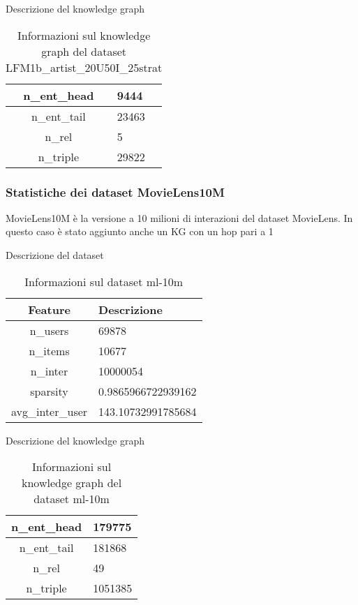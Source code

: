 \noindent Descrizione del knowledge graph
\begin{table}[H]
    \centering
    \footnotesize
    \begin{tabularx}{\textwidth}{|c|X|}
        \hline
        n\_ent\_head & 9444 \\
        \hline
        n\_ent\_tail & 23463 \\
        \hline
        n\_rel & 5 \\
        \hline
        n\_triple & 29822 \\
        \hline
    \end{tabularx}
    \caption{Informazioni sul knowledge graph del dataset LFM1b\_artist\_20U50I\_25strat}
    \label{tab:dataset_info}
\end{table}

\newpage

\subsubsection{Statistiche dei dataset MovieLens10M}

\noindent MovieLens10M è la versione a 10 milioni di interazioni del dataset MovieLens. In questo caso è stato aggiunto anche un KG con un hop pari a 1

\noindent Descrizione del dataset
\begin{table}[H]
    \centering
    \footnotesize
    \begin{tabularx}{\textwidth}{|c|X|}
        \hline
        \textbf{Feature} & \textbf{Descrizione} \\
        \hline
        n\_users & 69878 \\
        \hline
        n\_items & 10677 \\
        \hline
        n\_inter & 10000054 \\
        \hline
        sparsity & 0.9865966722939162 \\
        \hline
        avg\_inter\_user & 143.10732991785684 \\
        \hline
    \end{tabularx}
    \caption{Informazioni sul dataset ml-10m}
    \label{tab:dataset_info}
\end{table}


\noindent Descrizione del knowledge graph
\begin{table}[H]
    \centering
    \footnotesize
    \begin{tabularx}{\textwidth}{|c|X|}
        \hline
        n\_ent\_head & 179775 \\
        \hline
        n\_ent\_tail & 181868 \\
        \hline
        n\_rel & 49 \\
        \hline
        n\_triple & 1051385 \\
        \hline
    \end{tabularx}
    \caption{Informazioni sul knowledge graph del dataset ml-10m}
    \label{tab:dataset_info}
\end{table}




